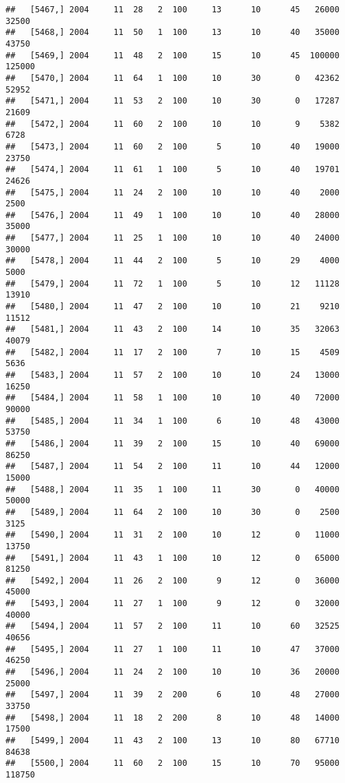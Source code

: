 \documentclass{article}\usepackage[]{graphicx}\usepackage[]{color}
\makeatletter
\newenvironment{kframe}{%
 \def\at@end@of@kframe{}%
 \ifinner\ifhmode%
  \def\at@end@of@kframe{\end{minipage}}%
  \begin{minipage}{\columnwidth}%
 \fi\fi%
 \def\FrameCommand##1{\hskip\@totalleftmargin \hskip-\fboxsep
 \colorbox{shadecolor}{##1}\hskip-\fboxsep
     \hskip-\linewidth \hskip-\@totalleftmargin \hskip\columnwidth}%
 \MakeFramed {\advance\hsize-\width
   \@totalleftmargin\z@ \linewidth\hsize
   \@setminipage}}%
 {\par\unskip\endMakeFramed%
 \at@end@of@kframe}
\newenvironment{knitrout}{}{} %
\makeatother
\begin{document}
\begin{knitrout}
\begin{kframe}
\begin{verbatim}
##   [5467,] 2004     11  28   2  100     13      10      45   26000   32500
##   [5468,] 2004     11  50   1  100     13      10      40   35000   43750
##   [5469,] 2004     11  48   2  100     15      10      45  100000  125000
##   [5470,] 2004     11  64   1  100     10      30       0   42362   52952
##   [5471,] 2004     11  53   2  100     10      30       0   17287   21609
##   [5472,] 2004     11  60   2  100     10      10       9    5382    6728
##   [5473,] 2004     11  60   2  100      5      10      40   19000   23750
##   [5474,] 2004     11  61   1  100      5      10      40   19701   24626
##   [5475,] 2004     11  24   2  100     10      10      40    2000    2500
##   [5476,] 2004     11  49   1  100     10      10      40   28000   35000
##   [5477,] 2004     11  25   1  100     10      10      40   24000   30000
##   [5478,] 2004     11  44   2  100      5      10      29    4000    5000
##   [5479,] 2004     11  72   1  100      5      10      12   11128   13910
##   [5480,] 2004     11  47   2  100     10      10      21    9210   11512
##   [5481,] 2004     11  43   2  100     14      10      35   32063   40079
##   [5482,] 2004     11  17   2  100      7      10      15    4509    5636
##   [5483,] 2004     11  57   2  100     10      10      24   13000   16250
##   [5484,] 2004     11  58   1  100     10      10      40   72000   90000
##   [5485,] 2004     11  34   1  100      6      10      48   43000   53750
##   [5486,] 2004     11  39   2  100     15      10      40   69000   86250
##   [5487,] 2004     11  54   2  100     11      10      44   12000   15000
##   [5488,] 2004     11  35   1  100     11      30       0   40000   50000
##   [5489,] 2004     11  64   2  100     10      30       0    2500    3125
##   [5490,] 2004     11  31   2  100     10      12       0   11000   13750
##   [5491,] 2004     11  43   1  100     10      12       0   65000   81250
##   [5492,] 2004     11  26   2  100      9      12       0   36000   45000
##   [5493,] 2004     11  27   1  100      9      12       0   32000   40000
##   [5494,] 2004     11  57   2  100     11      10      60   32525   40656
##   [5495,] 2004     11  27   1  100     11      10      47   37000   46250
##   [5496,] 2004     11  24   2  100     10      10      36   20000   25000
##   [5497,] 2004     11  39   2  200      6      10      48   27000   33750
##   [5498,] 2004     11  18   2  200      8      10      48   14000   17500
##   [5499,] 2004     11  43   2  100     13      10      80   67710   84638
##   [5500,] 2004     11  60   2  100     15      10      70   95000  118750

\end{verbatim}
\end{kframe}
\end{knitrout}
\end{document}
